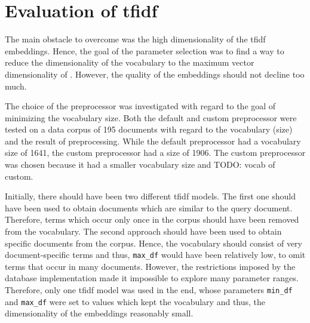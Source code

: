 \section{Evaluation of \acs{tfidf}}\label{sec:evaluation-tfidf}

The main obstacle to overcome was the high dimensionality of the \ac{tfidf} embeddings.
Hence, the goal of the parameter selection was to find a way to reduce the dimensionality of the vocabulary to the maximum vector dimensionality of \databaseName{}.
However, the quality of the embeddings should not decline too much.

The choice of the preprocessor was investigated with regard to the goal of minimizing the vocabulary size.
Both the default and custom preprocessor were tested on a data corpus of 195 documents with regard to the vocabulary (size) and the result of preprocessing.
While the default preprocessor had a vocabulary size of 1641, the custom preprocessor had a size of 1906.
The custom preprocessor was chosen because it had a smaller vocabulary size and TODO: vocab of custom.

Initially, there should have been two different \ac{tfidf} models.
The first one should have been used to obtain documents which are similar to the query document.
Therefore, terms which occur only once in the corpus should have been removed from the vocabulary.
The second approach should have been used to obtain specific documents from the corpus.
Hence, the vocabulary should consist of very document-specific terms and thus, \texttt{max\_df} would have been relatively low, to omit terms that occur in many documents.
However, the restrictions imposed by the database implementation made it impossible to explore many parameter ranges.
Therefore, only one \ac{tfidf} model was used in the end, whose parameters \texttt{min\_df} and \texttt{max\_df} were set to values which kept the vocabulary and thus,
the dimensionality of the embeddings reasonably small.